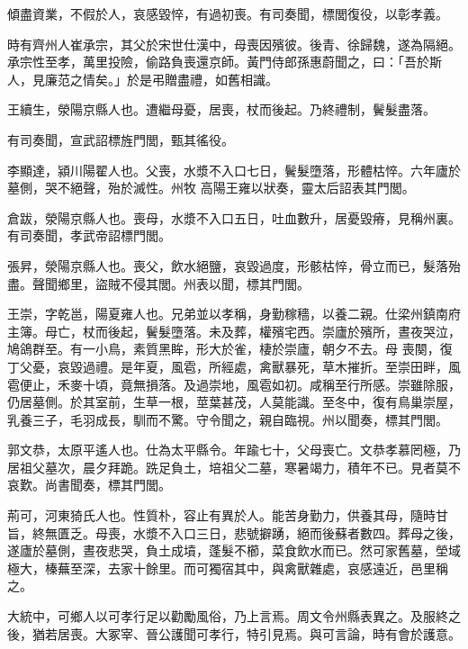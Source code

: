\begin{pinyinscope}
 傾盡資業，不假於人，哀感毀悴，有過初喪。有司奏聞，標閭復役，以彰孝義。



 時有齊州人崔承宗，其父於宋世仕漢中，母喪因殯彼。後青、徐歸魏，遂為隔絕。承宗性至孝，萬里投險，偷路負喪還京師。黃門侍郎孫惠蔚聞之，曰：「吾於斯人，見廉范之情矣。」於是弔贈盡禮，如舊相識。



 王續生，滎陽京縣人也。遭繼母憂，居喪，杖而後起。乃終禮制，鬢髮盡落。



 有司奏聞，宣武詔標旌門閭，甄其徭役。



 李顯達，潁川陽翟人也。父喪，水漿不入口七日，鬢髮墮落，形體枯悴。六年廬於墓側，哭不絕聲，殆於滅性。州牧
 高陽王雍以狀奏，靈太后詔表其門閭。



 倉跋，滎陽京縣人也。喪母，水漿不入口五日，吐血數升，居憂毀瘠，見稱州裏。有司奏聞，孝武帝詔標門閭。



 張昇，滎陽京縣人也。喪父，飲水絕鹽，哀毀過度，形骸枯悴，骨立而已，髮落殆盡。聲聞鄉里，盜賊不侵其閭。州表以聞，標其門閭。



 王崇，字乾邕，陽夏雍人也。兄弟並以孝稱，身勤稼穡，以養二親。仕梁州鎮南府主簿。母亡，杖而後起，鬢髮墮落。未及葬，權殯宅西。崇廬於殯所，晝夜哭泣，鳩鴿群至。有一小鳥，素質黑眸，形大於雀，棲於崇廬，朝夕不去。母
 喪闋，復丁父憂，哀毀過禮。是年夏，風雹，所經處，禽獸暴死，草木摧折。至崇田畔，風雹便止，禾麥十頃，竟無損落。及過崇地，風雹如初。咸稱至行所感。崇雖除服，仍居墓側。於其室前，生草一根，莖葉甚茂，人莫能識。至冬中，復有鳥巢崇屋，乳養三子，毛羽成長，馴而不驚。守令聞之，親自臨視。州以聞奏，標其門閭。



 郭文恭，太原平遙人也。仕為太平縣令。年踰七十，父母喪亡。文恭孝慕罔極，乃居祖父墓次，晨夕拜跪。跣足負土，培祖父二墓，寒暑竭力，積年不已。見者莫不哀歎。尚書聞奏，標其門閭。



 荊可，河東猗氏人也。性質朴，容止有異於人。能苦身勤力，供養其母，隨時甘旨，終無匱乏。母喪，水漿不入口三日，悲號擗踴，絕而後蘇者數四。葬母之後，遂廬於墓側，晝夜悲哭，負土成墳，蓬髮不櫛，菜食飲水而已。然可家舊墓，塋域極大，榛蕪至深，去家十餘里。而可獨宿其中，與禽獸雜處，哀感遠近，邑里稱之。



 大統中，可鄉人以可孝行足以勸勵風俗，乃上言焉。周文令州縣表異之。及服終之後，猶若居喪。大冢宰、晉公護聞可孝行，特引見焉。與可言論，時有會於護意。




\end{pinyinscope}
